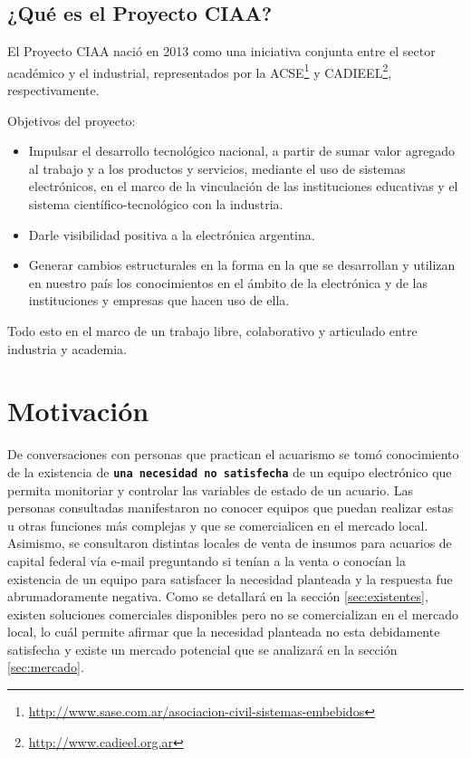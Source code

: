 \subsection{¿Qué es el Proyecto CIAA?}
\label{sec:proyecto-ciaa}

El Proyecto CIAA nació en 2013 como una iniciativa conjunta entre el sector académico y el industrial, representados por la ACSE\footnote{\url{http://www.sase.com.ar/asociacion-civil-sistemas-embebidos}} y CADIEEL\footnote{\url{http://www.cadieel.org.ar}}, respectivamente.

Objetivos del proyecto:

\begin{itemize}
	\item Impulsar el desarrollo tecnológico nacional, a partir de sumar valor agregado al trabajo y a los productos y servicios, mediante el uso de sistemas electrónicos, en el marco de la vinculación de las instituciones educativas y el sistema científico-tecnológico con la industria.
	\item Darle visibilidad positiva a la electrónica argentina.
	\item Generar cambios estructurales en la forma en la que se desarrollan y utilizan en nuestro país los conocimientos en el ámbito de la electrónica y de las instituciones y empresas que hacen uso de ella.
\end{itemize}

Todo esto en el marco de un trabajo libre, colaborativo y articulado entre industria y academia. 


\section{Motivación}

De conversaciones con personas que practican el acuarismo se tomó conocimiento de la existencia de \textbf{\texttt{una necesidad no satisfecha}} de un equipo electrónico que permita monitoriar y controlar las variables de estado de un acuario.  
Las personas consultadas manifestaron no conocer equipos que puedan realizar estas u otras funciones más complejas y que se comercialicen en el mercado local.  
Asimismo, se consultaron distintas locales de venta de insumos para acuarios de capital federal vía e-mail preguntando si tenían a la venta o conocían la existencia de un equipo para satisfacer la necesidad planteada y la respuesta fue abrumadoramente negativa. Como se detallará en la sección \ref{sec:existentes}, existen soluciones comerciales disponibles pero no se comercializan en el mercado local, lo cuál permite afirmar que la necesidad planteada no esta debidamente satisfecha y existe un mercado potencial que se analizará en la sección \ref{sec:mercado}.

